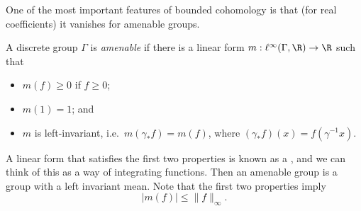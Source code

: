 \documentclass[a4paper]{article}
\begin{document}
One of the most important features of bounded cohomology is that (for real coefficients) it vanishes for amenable groups.
\begin{defi}
  A discrete group $\Gamma$ is \emph{amenable} if there is a linear form $m: \ell^\infty(\Gamma,\R) \to \R$ such that
  \begin{itemize}
    \item $m(f) \geq 0$ if $f \geq 0$;
    \item $m(1) = 1$; and
    \item $m$ is left-invariant, i.e.\ $m(\gamma_* f) = m(f)$, where $(\gamma_* f)(x) = f(\gamma^{-1}x)$.
  \end{itemize}
\end{defi}
A linear form that satisfies the first two properties is known as a , and we can think of this as a way of integrating functions. Then an amenable group is a group with a left invariant mean. Note that the first two properties imply
\[
  |m(f)| \leq \|f\|_\infty.
\]
\end{document}
